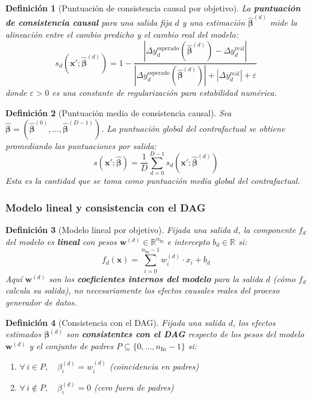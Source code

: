 \documentclass[12pt]{report} %
\newtheorem{definition}{Definición}
\begin{document}
\begin{definition}[Puntuación de consistencia causal por objetivo]
    La \textbf{puntuación de consistencia causal} para una salida fija $d$ y una estimación $\widehat{\boldsymbol{\beta}}^{(d)}$ mide la alineación entre el cambio predicho y el cambio real del modelo:
    \begin{equation}
        s_d\!\left(\mathbf{x}'; \widehat{\boldsymbol{\beta}}^{(d)}\right)
        = 1 - \frac{\left|\Delta y_d^{\text{esperado}}\!\left(\widehat{\boldsymbol{\beta}}^{(d)}\right) - \Delta y_d^{\text{real}}\right|}{\left|\Delta y_d^{\text{esperado}}\!\left(\widehat{\boldsymbol{\beta}}^{(d)}\right)\right| + |\Delta y_d^{\text{real}}| + \varepsilon}
        \label{eq:formal_causal_score}
    \end{equation}
    donde $\varepsilon > 0$ es una constante de regularización para estabilidad numérica.
\end{definition}

\begin{definition}[Puntuación media de consistencia causal]
    Sea $\widehat{\boldsymbol{\beta}} = (\widehat{\boldsymbol{\beta}}^{(0)}, \ldots, \widehat{\boldsymbol{\beta}}^{(D-1)})$. La puntuación global del contrafactual se obtiene promediando las puntuaciones por salida:
    $$s(\mathbf{x}'; \widehat{\boldsymbol{\beta}}) = \frac{1}{D}\sum_{d=0}^{D-1} s_d\!\left(\mathbf{x}'; \widehat{\boldsymbol{\beta}}^{(d)}\right)$$
    Esta es la cantidad que se toma como puntuación media global del contrafactual.
\end{definition}

\subsubsection{Modelo lineal y consistencia con el DAG}

\begin{definition}[Modelo lineal por objetivo]
    Fijada una salida $d$, la componente $f_d$ del modelo es \textbf{lineal} con pesos $\mathbf{w}^{(d)} \in \mathbb{R}^{n_{\text{In}}}$ e intercepto $b_d \in \mathbb{R}$ si:
    $$f_d(\mathbf{x}) = \sum_{i=0}^{n_{\text{In}}-1} w_i^{(d)} \cdot x_i + b_d$$
    Aquí $\mathbf{w}^{(d)}$ son los \textbf{coeficientes internos del modelo} para la salida $d$ (cómo $f_d$ calcula su salida), no necesariamente los efectos causales reales del proceso generador de datos.
\end{definition}

\begin{definition}[Consistencia con el DAG]
    Fijada una salida $d$, los efectos estimados $\boldsymbol{\beta}^{(d)}$ son \textbf{consistentes con el DAG} respecto de los pesos del modelo $\mathbf{w}^{(d)}$ y el conjunto de padres $P \subseteq \{0, \ldots, n_{\text{In}}-1\}$ si:
    \begin{enumerate}
        \item $\forall\, i \in P,\quad \beta_i^{(d)} = w_i^{(d)}$ \quad (coincidencia en padres)
        \item $\forall\, i \notin P,\quad \beta_i^{(d)} = 0$ \quad (cero fuera de padres)
    \end{enumerate}
\end{definition}
\end{document}

